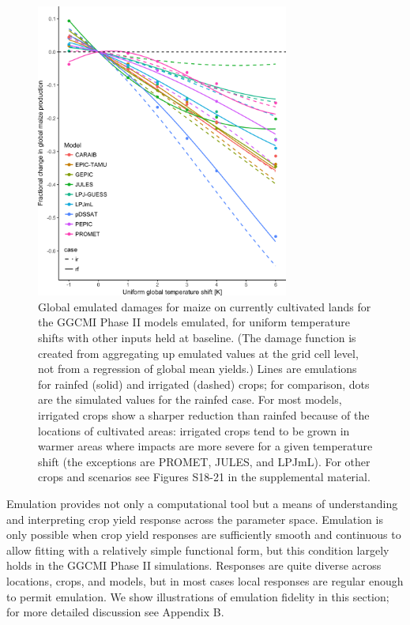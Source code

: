 \documentclass[gmd, manuscript]{copernicus} %
\begin{document}
\begin{figure}[ht]
    \centering
    \includegraphics[width=8.3cm]{figures/global_em_maize.png}
    \caption{Global emulated damages for maize on currently cultivated lands for the GGCMI Phase II models emulated, for uniform temperature shifts with other inputs held at baseline. (The damage function is created from aggregating up emulated values at the grid cell level, not from a regression of global mean yields.) Lines are emulations for rainfed (solid) and irrigated (dashed) crops; for comparison, dots are the simulated values for the rainfed case.  For most models, irrigated crops show a sharper reduction than rainfed because of the locations of cultivated areas: irrigated crops tend to be grown in warmer areas where impacts are more severe for a given temperature shift (the exceptions are PROMET, JULES, and LPJmL). For other crops and scenarios see Figures S18-21 in the supplemental material.}
    \label{fig:globe_em}
\end{figure}

Emulation provides not only a computational tool but a means of understanding and interpreting crop yield response across the parameter space. Emulation is only possible  when crop yield responses are sufficiently smooth and continuous to allow fitting with a relatively simple functional form, but this condition largely holds in the GGCMI Phase II simulations. Responses are quite diverse across locations, crops, and models, but in most cases local responses are regular enough to permit emulation. We show illustrations of emulation fidelity in this section; for more detailed discussion see Appendix B.
\end{document}

